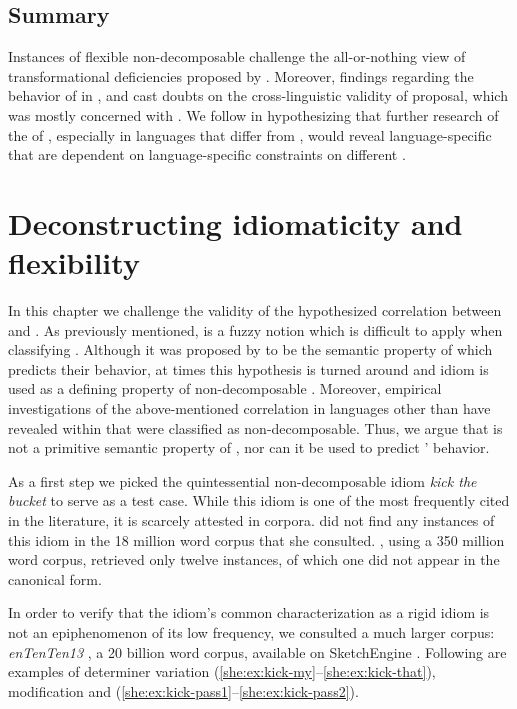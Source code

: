 \documentclass[output=paper]{langsci/langscibook}
\begin{document}
\subsection{Summary}\largerpage
Instances of flexible non-decomposable  challenge the
all-or-nothing view of transformational deficiencies proposed by \citet{nunberg94}. Mo\-reover, findings regarding the behavior of  in ,  and  cast doubts on the cross-linguistic validity of  proposal, which was mostly concerned with  . We follow \citet{bargmannsailer15} in hypothesizing that further research of the  of ,
especially in languages that differ from , would reveal
language-specific  that are dependent on language-specific
constraints on different .

\section{Deconstructing idiomaticity and flexibility}\largerpage
In this chapter we challenge the validity of the hypothesized correlation between  and . As previously mentioned,  is a fuzzy notion which is difficult to apply when classifying . Although it was proposed by \citet{nunberg94} to be the semantic property of  which predicts their behavior, at times this hypothesis is turned around and idiom  is used as a defining property of non-decomposable . Moreover, empirical investigations of the above-mentioned correlation in languages other than  have revealed  within  that were classified as non-decomposable. Thus, we argue that  is not a primitive semantic property of , nor can it be used to predict ' behavior.

As a first step we picked the quintessential non-decomposable idiom \textit{kick the bucket} to serve as a test case. While this idiom is one of the most frequently cited  in the literature, it is scarcely attested in corpora. \citet{moon98} did not find any instances of this idiom in the 18 million word corpus that she consulted. \citet{riehemann01}, using a 350 million word corpus, retrieved only twelve instances, of which one did not appear in the canonical form.

In order to verify that the idiom's common characterization as a rigid idiom is not an epiphenomenon of its low frequency, we consulted a much larger corpus: \emph{enTenTen13} \citep{baroni-bernardini-ferraresi-zanchetta-2009}, a 20 billion word  corpus, available on SketchEngine \citep{sketchengine}. Following are examples of determiner variation (\ref{she:ex:kick-my}--\ref{she:ex:kick-that}), modification  and  (\ref{she:ex:kick-pass1}--\ref{she:ex:kick-pass2}).
\end{document}
